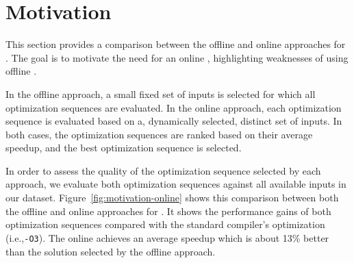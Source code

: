 \section{Motivation}



This section provides a comparison between the offline and online approaches for
{\itercomp}.
The goal is to motivate the need for an online {\itercomp}, highlighting
weaknesses of using offline {\itercomp}.



In the offline approach, a small fixed set of inputs is selected for which all
optimization sequences are evaluated.
In the online approach, each optimization sequence is evaluated based on a,
dynamically selected, distinct set of inputs.
In both cases, the optimization sequences are ranked based on their average
speedup, and the best optimization sequence is selected.

In order to assess the quality of the optimization sequence selected by each
approach, we evaluate both optimization sequences against all available inputs
in our dataset.
Figure~\ref{fig:motivation-online} shows this comparison between both the offline
and online approaches for {\itercomp}.
It shows the performance gains of both optimization sequences compared with the
standard compiler's optimization (i.e.,\texttt{-O3}).
The online {\itercomp} achieves an average speedup which is about 13\% better
than the solution selected by the offline approach.

